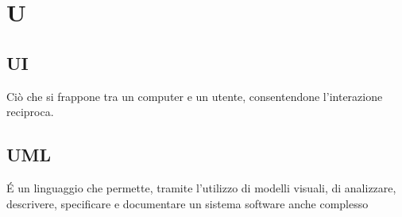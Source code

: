 \section*{U}
\markright{}
\subsection*{UI}
Ciò che si frappone tra un computer e un utente, consentendone l'interazione reciproca.

\subsection*{UML}
\'E un linguaggio che permette, tramite l’utilizzo di modelli visuali, di analizzare, descrivere, specificare e documentare un sistema software anche complesso
